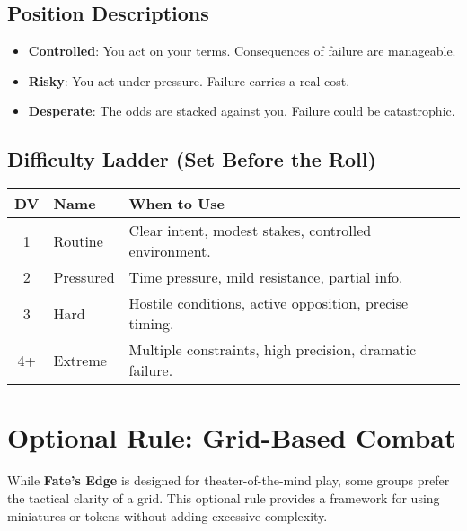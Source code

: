 \subsection*{Position Descriptions}

\begin{itemize}
    \item \textbf{Controlled}: You act on your terms. Consequences of failure are manageable.
    \item \textbf{Risky}: You act under pressure. Failure carries a real cost.
    \item \textbf{Desperate}: The odds are stacked against you. Failure could be catastrophic.
\end{itemize}

\subsection*{Difficulty Ladder (Set Before the Roll)}

\begin{center}
\begin{tabular}{cll}
\toprule
\textbf{DV} & \textbf{Name} & \textbf{When to Use} \\
\midrule
1 & Routine\index{Difficulty Value!Routine} & Clear intent, modest stakes, controlled environment. \\
2 & Pressured\index{Difficulty Value!Pressured} & Time pressure, mild resistance, partial info. \\
3 & Hard\index{Difficulty Value!Hard} & Hostile conditions, active opposition, precise timing. \\
4+ & Extreme\index{Difficulty Value!Extreme} & Multiple constraints, high precision, dramatic failure. \\
\bottomrule
\end{tabular}
\end{center}

\section*{Optional Rule: Grid-Based Combat}

While \textbf{Fate's Edge} is designed for theater-of-the-mind play, some groups prefer the tactical clarity of a grid. This optional rule provides a framework for using miniatures or tokens without adding excessive complexity.

